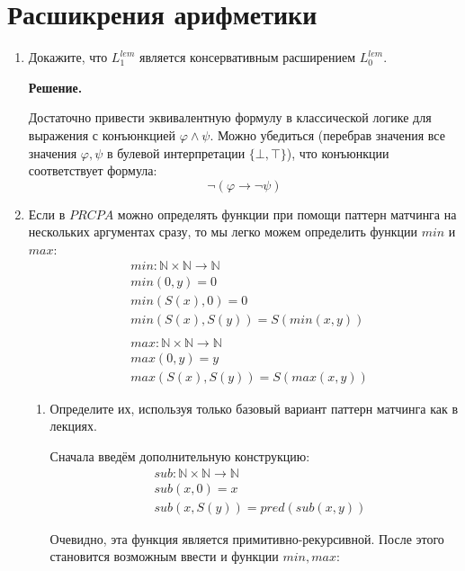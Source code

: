 \section*{Расшикрения арифметики}

\begin{enumerate}

\item Докажите, что $L_1^{lem}$ является консервативным расширением $L_0^{lem}$.

\textbf{Решение.} 

Достаточно привести эквивалентную формулу в классической логике для выражения с конъюнкцией $\varphi \land \psi$. Можно убедиться (перебрав значения все значения $\varphi, \psi$ в булевой интерпретации $\{\bot,\top\}$), что конъюнкции соответствует формула:
\begin{equation*}
	\neg(\varphi \to \neg \psi)
\end{equation*}

\item Если в $PRCPA$ можно определять функции при помощи паттерн матчинга на нескольких аргументах сразу, то мы легко можем определить функции $min$ и $max$:
\begin{align*}
& min : \mathbb{N} \times \mathbb{N} \to \mathbb{N} \\
& min(0,y) = 0 \\
& min(S(x),0) = 0 \\
& min(S(x),S(y)) = S(min(x,y)) \\
& \\
& max : \mathbb{N} \times \mathbb{N} \to \mathbb{N} \\
& max(0,y) = y \\
& max(S(x),S(y)) = S(max(x,y))
\end{align*}
\begin{enumerate}
\item Определите их, используя только базовый вариант паттерн матчинга как в лекциях.

Сначала введём дополнительную конструкцию:
\begin{align*}
& sub : \mathbb{N} \times \mathbb{N} \to \mathbb{N} \\
& sub (x, 0) = x \\
& sub (x, S(y)) = pred (sub(x, y))
\end{align*}

Очевидно, эта функция является примитивно-рекурсивной. После этого становится возможным ввести и функции $min, max$:


\end{enumerate}
\end{enumerate}
